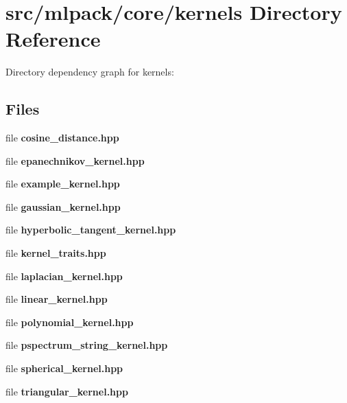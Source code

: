 \section{src/mlpack/core/kernels Directory Reference}
\label{dir_26f4c547aa789b58e4251d7d29e5a096}
Directory dependency graph for kernels\-:
\subsection*{Files}
\begin{DoxyCompactItemize}
\item 
file {\bf cosine\-\_\-distance.\-hpp}
\item 
file {\bf epanechnikov\-\_\-kernel.\-hpp}
\item 
file {\bf example\-\_\-kernel.\-hpp}
\item 
file {\bf gaussian\-\_\-kernel.\-hpp}
\item 
file {\bf hyperbolic\-\_\-tangent\-\_\-kernel.\-hpp}
\item 
file {\bf kernel\-\_\-traits.\-hpp}
\item 
file {\bf laplacian\-\_\-kernel.\-hpp}
\item 
file {\bf linear\-\_\-kernel.\-hpp}
\item 
file {\bf polynomial\-\_\-kernel.\-hpp}
\item 
file {\bf pspectrum\-\_\-string\-\_\-kernel.\-hpp}
\item 
file {\bf spherical\-\_\-kernel.\-hpp}
\item 
file {\bf triangular\-\_\-kernel.\-hpp}
\end{DoxyCompactItemize}

